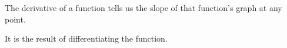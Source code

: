 The derivative of a function tells us the slope 
of that function's graph at any point.
\par
It is the result of differentiating the function.